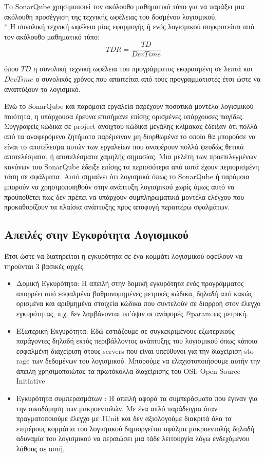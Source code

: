 \documentclass[a4paper, 11pt]{article}
\begin{document}
{{Το \textlatin{SonarQube} χρησιμοποιεί τον ακόλουθο μαθηματικό τύπο για να παράξει μια ακόλουθη προσέγγιση της τεχνικής ωφέλειας του δοσμένου λογισμικού.
\\*
Η συνολική τεχνική ωφέλεια μίας εφαρμογής ή ενός λογισμικού συγκροτείται από τον ακόλουθο μαθηματικό τύπο:
\[T DR = \frac{TD}{DevT ime} \]

όπου \(TD\) η συνολική τεχνική ωφέλεια του προγράμματος εκφρασμένη σε λεπτά 
και \(DevTime\) ο συνολικός χρόνος που απαιτείται από τους προγραμματιστές έτσι ώστε να αναπτύξουν το λογισμικό.

Ενώ το \textlatin{SonarQube} και παρόμοια εργαλεία παρέχουν ποσοτικά μοντέλα λογισμικού
ποιότητα, η υπάρχουσα έρευνα επισήμανε επίσης ορισμένες υπάρχουσες παγίδες. Συγγραφείς κώδικα σε \textlatin{project} ανοιχτού κώδικα μεγάλης κλίμακας έδειξαν ότι πολλά από τα αναφερόμενα ζητήματα παρέμειναν
μη διορθωμένα το οποίο θα μπορούσε να είναι το αποτέλεσμα αυτών των εργαλείων που αναφέρουν πολλά ψευδώς θετικά αποτελέσματα,
ή αποτελέσματα χαμηλής σημασίας. Μια μελέτη των προεπιλεγμένων κανόνων του \textlatin{SonarQube} έδειξε επίσης
τα περισσότερα από αυτά έχουν περιορισμένη τάση σε σφάλματα. Αυτό σημαίνει ότι λογισμικά όπως το \textlatin{SonarQube} ή παρόμοια μπορούν να χρησιμοποιηθούν στην ανάπτυξη λογισμικού χωρίς όμως αυτό να προϋποθέτει πως δεν πρέπει να υπάρχουν συμπληρωματικά μοντέλα ελέγχου που προκαθορίζουν τα πλαίσια ανάπτυξης προς αποφυγή περαιτέρω σφαλμάτων.

\subsection{Απειλές στην Εγκυρότητα Λογισμικού}
Έτσι ώστε να διατηρείται η εγκυρότητα σε ένα κομμάτι λογισμικού οφείλουν να τηρούνται 3 βασικές αρχές
\begin{itemize}
\item Δομική Εγκυρότητα: Η απειλή στην δομική εγκυρότητα ενός προγράμματος απορρέει από εσφαλμένα βαθμονομημένες μετρικές κώδικα, δηλαδή από κακώς ορισμένα και αριθμημένα στοιχεία κώδικα που συντελούν σε διαρροή στον έλεγχο εγκυρότητας, π.χ. δεν λαμβάνονται υπ'όψιν οι ανάφορές \textlatin{@param} ως μετρική.
\item Εξωτερική Εκγυρότητα: Εδώ εστιάζουμε σε συγκεκριμένους εξωτερικούς παράγοντες δηλαδή εκτός περιβάλλοντος ανάπτυξης του λογισμικού όπως κάποια εσφαλμένη διαχείριση στους \textlatin{servers} που είναι υπεύθυνοι για την διαχείριση  \textlatin{storage} των δεδομένων του λογισμικού. Μπορούμε να ελαχιστοποιήσουμε αυτήν την άπειλη χρησιμοποιώτας τα πρωτόκολλα διαχείρισης του \textlatin{OSI: Open Source Initiative}
\item Εγκυρότητα συμπερασμάτων : Η απειλή  αφορά τα συμπεράσματα που έγιναν για την οικοδόμηση των μακροεντολών. Με ένα απλό παράδειγμα όταν πραγματοποιούμε έλεγχο με \textlatin{JUnit} και δεν αξιολογούμε διακριτά όλα τα επιμέρους κομμάτια του λογισμικού δημιοργείται σφάλμα μακροεντολής δηλαδή αδυναμία του λογισμικού να περαιώσει μια τάδε λειτουργία λόγω ενδεχόμενου λάθους σε αυτή. 
\end{itemize}

}}
\end{document}
